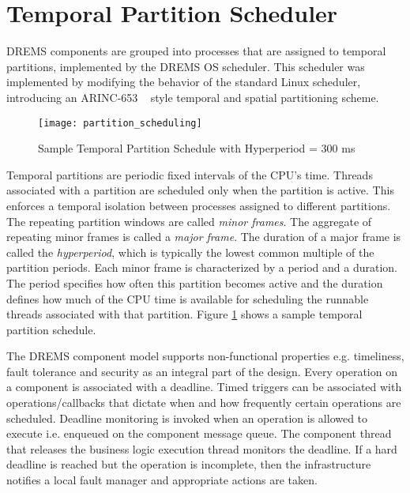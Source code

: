 \section{Temporal Partition Scheduler}

DREMS components are grouped into processes that are assigned to temporal partitions, implemented by the DREMS OS scheduler. This scheduler was implemented by modifying the behavior of the standard Linux scheduler, introducing an ARINC-653 ~\cite{ARINC-653} style temporal and spatial partitioning scheme. 

\begin{figure}[ht]
	\centering
	\texttt{[image: partition\_scheduling]}
	\caption{Sample Temporal Partition Schedule with Hyperperiod = 300 ms}
	\label{fig:partition_scheduling}
\end{figure}


Temporal partitions are periodic fixed intervals of the CPU's time. Threads associated with a partition are scheduled only when the partition is active. This enforces a temporal isolation between processes assigned to different partitions. The repeating partition windows are called \emph{minor frames}. The aggregate of repeating minor frames is called a \emph{major frame}. The duration of a major frame is called the \emph{hyperperiod}, which is typically the lowest common multiple of the partition periods. Each minor frame is characterized by a period and a duration. The period specifies how often this partition becomes active and the duration defines how much of the CPU time is available for scheduling the runnable threads associated with that partition. Figure \ref{fig:partition_scheduling} shows a sample temporal partition schedule. 

The DREMS component model supports non-functional properties e.g. timeliness, fault tolerance and security as an integral part of the design. Every operation on a component is associated with a deadline. Timed triggers can be associated with operations/callbacks that dictate when and how frequently certain operations are scheduled. Deadline monitoring is invoked when an operation is allowed to execute i.e. enqueued on the component message queue. The component thread that releases the business logic execution thread monitors the deadline. If a hard deadline is reached but the operation is incomplete, then the infrastructure notifies a local fault manager and appropriate actions are taken. 

